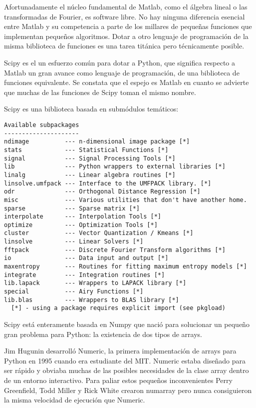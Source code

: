 \documentclass[a4paper,10pt]{article}
\begin{document}
Afortunadamente el núcleo fundamental de Matlab, como el álgebra
lineal o las transformadas de Fourier, es software libre. No hay
ninguna diferencia esencial entre Matlab y su competencia a parte de
los millares de pequeñas funciones que implementan pequeños
algoritmos. Dotar a otro lenguaje de programación de la misma
biblioteca de funciones es una tarea titánica pero técnicamente
posible.

Scipy es el un esfuerzo común para dotar a Python, que significa
respecto a Matlab un gran avance como lenguaje de programación, de una
biblioteca de funciones equivalente. Se constata que el espejo es
Matlab en cuanto se advierte que muchas de las funciones de Scipy
toman el mismo nombre.

Scipy es una biblioteca basada en submódulos temáticos:

\begin{lstlisting}
Available subpackages
---------------------
ndimage          --- n-dimensional image package [*]
stats            --- Statistical Functions [*]
signal           --- Signal Processing Tools [*]
lib              --- Python wrappers to external libraries [*]
linalg           --- Linear algebra routines [*]
linsolve.umfpack --- Interface to the UMFPACK library. [*]
odr              --- Orthogonal Distance Regression [*]
misc             --- Various utilities that don't have another home.
sparse           --- Sparse matrix [*]
interpolate      --- Interpolation Tools [*]
optimize         --- Optimization Tools [*]
cluster          --- Vector Quantization / Kmeans [*]
linsolve         --- Linear Solvers [*]
fftpack          --- Discrete Fourier Transform algorithms [*]
io               --- Data input and output [*]
maxentropy       --- Routines for fitting maximum entropy models [*]
integrate        --- Integration routines [*]
lib.lapack       --- Wrappers to LAPACK library [*]
special          --- Airy Functions [*]
lib.blas         --- Wrappers to BLAS library [*]
  [*] - using a package requires explicit import (see pkgload)
\end{lstlisting}

Scipy está enteramente basada en Numpy que nació para solucionar un
pequeño gran problema para Python: la existencia de dos tipos de
arrays.

Jim Hugunin desarrolló Numeric, la primera implementación de arrays
para Python en 1995 cuando era estudiante del MIT.  Numeric estaba
diseñado para ser rápido y obviaba muchas de las posibles necesidades
de la clase array dentro de un entorno interactivo. Para paliar estos
pequeños inconvenientes Perry Greenfield, Todd Miller y Rick White
crearon numarray pero nunca consiguieron la misma velocidad de
ejecución que Numeric.
\end{document}
